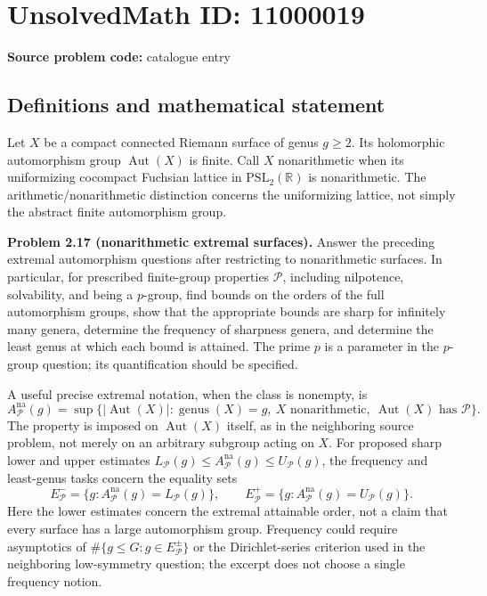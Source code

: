 \documentclass[11pt]{article}
\newcommand{\R}{\mathbb{R}}
\begin{document}
\section*{UnsolvedMath ID: 11000019}
\textbf{Source problem code:} catalogue entry
\subsection{Definitions and mathematical statement}
Let $X$ be a compact connected Riemann surface of genus $g\ge2$. Its holomorphic automorphism group $\operatorname{Aut}(X)$ is finite. Call $X$ nonarithmetic when its uniformizing cocompact Fuchsian lattice in $\mathrm{PSL}_2(\R)$ is nonarithmetic. The arithmetic/nonarithmetic distinction concerns the uniformizing lattice, not simply the abstract finite automorphism group.

\textbf{Problem 2.17 (nonarithmetic extremal surfaces).} Answer the preceding extremal automorphism questions after restricting to nonarithmetic surfaces. In particular, for prescribed finite-group properties $\mathcal P$, including nilpotence, solvability, and being a $p$-group, find bounds on the orders of the full automorphism groups, show that the appropriate bounds are sharp for infinitely many genera, determine the frequency of sharpness genera, and determine the least genus at which each bound is attained. The prime $p$ is a parameter in the $p$-group question; its quantification should be specified.

A useful precise extremal notation, when the class is nonempty, is
\[
 A_{\mathcal P}^{\mathrm{na}}(g)=\sup\{|\operatorname{Aut}(X)|:
 \operatorname{genus}(X)=g,\ X\text{ nonarithmetic},\
 \operatorname{Aut}(X)\text{ has }\mathcal P\}.
\]
The property is imposed on $\operatorname{Aut}(X)$ itself, as in the neighboring source problem, not merely on an arbitrary subgroup acting on $X$. For proposed sharp lower and upper estimates $L_{\mathcal P}(g)\le A_{\mathcal P}^{\mathrm{na}}(g)\le U_{\mathcal P}(g)$, the frequency and least-genus tasks concern the equality sets
\[
 E^-_{\mathcal P}=\{g:A_{\mathcal P}^{\mathrm{na}}(g)=L_{\mathcal P}(g)\},\qquad
 E^+_{\mathcal P}=\{g:A_{\mathcal P}^{\mathrm{na}}(g)=U_{\mathcal P}(g)\}.
\]
Here the lower estimates concern the extremal attainable order, not a claim that every surface has a large automorphism group. Frequency could require asymptotics of $\#\{g\le G:g\in E^\pm_{\mathcal P}\}$ or the Dirichlet-series criterion used in the neighboring low-symmetry question; the excerpt does not choose a single frequency notion.
\end{document}
